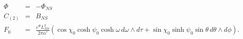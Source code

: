 \begin{equation}
\begin{array}{rcl}
\Phi & = & -\Phi_{NS} \\
C_{(2)} & = & B_{NS} \\
F_0 & = &
\displaystyle
\frac{e^{\Phi}L_{NS}^2}{2\pi\alpha'}
    (\cos\chi_0\cosh\psi_0\cosh\omega\,d\omega\wedge d\tau
    + \sin\chi_0\sinh\psi_0\sin\theta\,d\theta\wedge d\phi).
\end{array}
\end{equation}

